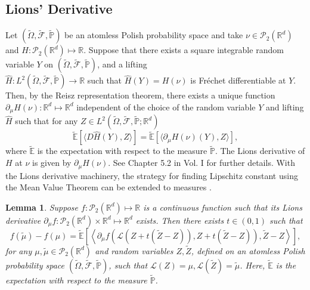 \documentclass{article}
\newtheorem{lemma}[theorem]{Lemma}
\newtheorem{definition}[theorem]{Definition}
\newcommand{\R}{\mathbb{R}}
\newcommand{\E}{\mathbb{E}}
\begin{document}
\begin{appendices}
\subsection{Lions' Derivative}
Let  $(\widetilde{\Omega}, \widetilde{\mathcal F},\widetilde{\mathbb P})$ be an atomless Polish probability space and take $\nu \in \mathcal P_2(\R^d)$ and $H:\mathcal P_2(\R^d)\mapsto \R$. Suppose that there exists a square integrable random variable $Y$ on $(\widetilde{\Omega}, \widetilde{\mathcal F},\widetilde{\mathbb P})$, and a lifting \\$\hat H:L^2(\widetilde{\Omega}, \widetilde{\mathcal F},\widetilde{\mathbb P})\to\R$ such that $\hat H(Y)=H(\nu)$ is Fr\'echet differentiable at $Y$.  Then, by the Reisz representation theorem, there exists a unique function $\partial_\mu H(\nu):\R^d\mapsto\R^d$ independent of the choice of the random variable $Y$ and lifting $\hat H$ such that for any $Z\in L^2(\widetilde{\Omega}, \widetilde{\mathcal F},\widetilde{\mathbb P};\R^d)$
\[
\widetilde{\mathbb E}[\langle D\hat H(Y),Z\rangle]= \widetilde{\mathbb E}[\langle\partial_{\mu}H(\nu)(Y),Z\rangle],
\]
where $\widetilde{\E}$ is the expectation with respect to the measure $\widetilde{\mathbb P}$.
The Lions derivative of $H$ at $\nu$ is given by $\partial_\mu H(\nu)$. See Chapter 5.2 in \cite{carmona2018probabilistic} Vol. I for further details.
With the Lions derivative machinery, the strategy for finding Lipschitz constant using the Mean Value Theorem can be extended to measures \cite{Kumar_2021}.
\begin{lemma}\label{ProbMeasureMVT}
    Suppose $f:\mathcal{P}_2(\mathbb{R}^d) \mapsto \mathbb{R}$ is a continuous function such that its Lions derivative $\partial_{\mu}f: \mathcal{P}_2(\mathbb{R}^d)\times \mathbb{R}^d \mapsto \mathbb{R}^d$ exists. Then there exists $t\in (0,1)$ such that 
    \[
    f(\tilde\mu)-f(\mu) = \widetilde{\mathbb{E}}\left[\left\langle\partial_{\mu}f\left(\mathcal{L}(Z + t(\tilde{Z}-Z)),Z + t(\tilde{Z}-Z)\right),\tilde{Z}-Z\right\rangle\right],
    \]
    for any $\mu,\tilde{\mu}\in \mathcal{P}_2(\mathbb{R}^d)$ and random variables $Z,\tilde{Z}$, defined on an atomless Polish probability space $(\widetilde{\Omega}, \widetilde{\mathcal{F}},\widetilde{\mathbb{P}})$, such that $\mathcal{L}(Z)=\mu,\mathcal{L}(\tilde{Z})=\tilde{\mu}$. Here, $\widetilde{\E}$ is the expectation with respect to the measure $\widetilde{\mathbb P}$.

\end{lemma}
\end{appendices}
\end{document}
